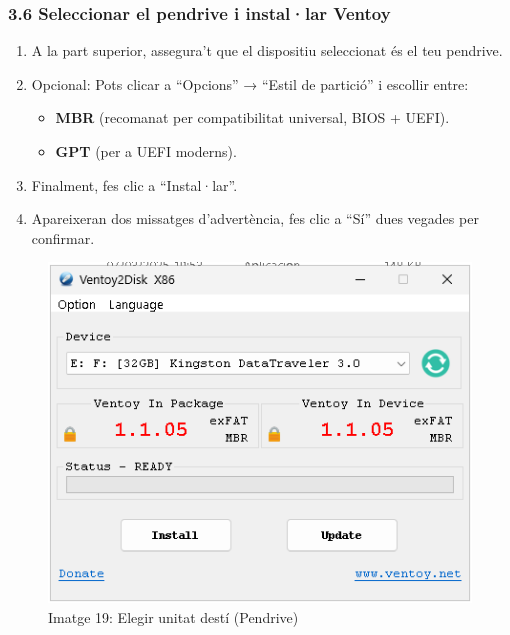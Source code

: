 \documentclass[
  12 pt,
  a4paper,
]{article}
\providecommand{\tightlist}{%
  \setlength{\itemsep}{0pt}\setlength{\parskip}{0pt}}
\begin{document}
\subsubsection{3.6 Seleccionar el pendrive i instal·lar
Ventoy}\label{seleccionar-el-pendrive-i-installar-ventoy}

\begin{enumerate}
\def\labelenumi{\arabic{enumi}.}
\tightlist
\item
  A la part superior, assegura't que el dispositiu seleccionat és el teu
  pendrive.\\
\item
  Opcional: Pots clicar a ``Opcions'' → ``Estil de partició'' i escollir
  entre:

  \begin{itemize}
  \tightlist
  \item
    \textbf{MBR} (recomanat per compatibilitat universal, BIOS +
    UEFI).\\
  \item
    \textbf{GPT} (per a UEFI moderns).\\
  \end{itemize}
\item
  Finalment, fes clic a ``Instal·lar''.\\
\item
  Apareixeran dos missatges d'advertència, fes clic a ``Sí'' dues
  vegades per confirmar.
\end{enumerate}

\begin{figure}
\centering
\includegraphics{png/executar2.png}
\caption{Imatge 19: Elegir unitat destí (Pendrive)}
\end{figure}
\end{document}
